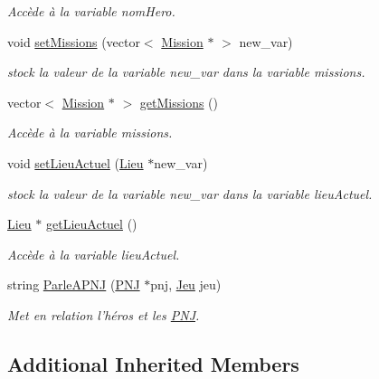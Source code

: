 \begin{DoxyCompactItemize}
\begin{DoxyCompactList}\small\item\em Accède à la variable nom\-Hero. \end{DoxyCompactList}\item 
void \hyperlink{class_heros_ae144c52184fc352808db4be369ced052}{set\-Missions} (vector$<$ \hyperlink{class_mission}{Mission} $\ast$ $>$ new\-\_\-var)
\begin{DoxyCompactList}\small\item\em stock la valeur de la variable new\-\_\-var dans la variable missions. \end{DoxyCompactList}\item 
vector$<$ \hyperlink{class_mission}{Mission} $\ast$ $>$ \hyperlink{class_heros_aae033294f652c209a599518e9a55fa83}{get\-Missions} ()
\begin{DoxyCompactList}\small\item\em Accède à la variable missions. \end{DoxyCompactList}\item 
void \hyperlink{class_heros_a8decc0b04f6724de10d2e2a8d1c3395c}{set\-Lieu\-Actuel} (\hyperlink{class_lieu}{Lieu} $\ast$new\-\_\-var)
\begin{DoxyCompactList}\small\item\em stock la valeur de la variable new\-\_\-var dans la variable lieu\-Actuel. \end{DoxyCompactList}\item 
\hyperlink{class_lieu}{Lieu} $\ast$ \hyperlink{class_heros_abb2a8141e5e2761b1eba4a902deca4ed}{get\-Lieu\-Actuel} ()
\begin{DoxyCompactList}\small\item\em Accède à la variable lieu\-Actuel. \end{DoxyCompactList}\item 
string \hyperlink{class_heros_a4052af6e407ebdf4918e62340d374829}{Parle\-A\-P\-N\-J} (\hyperlink{class_p_n_j}{P\-N\-J} $\ast$pnj, \hyperlink{class_jeu}{Jeu} jeu)
\begin{DoxyCompactList}\small\item\em Met en relation l'héros et les \hyperlink{class_p_n_j}{P\-N\-J}. \end{DoxyCompactList}\end{DoxyCompactItemize}
\subsection*{Additional Inherited Members}


